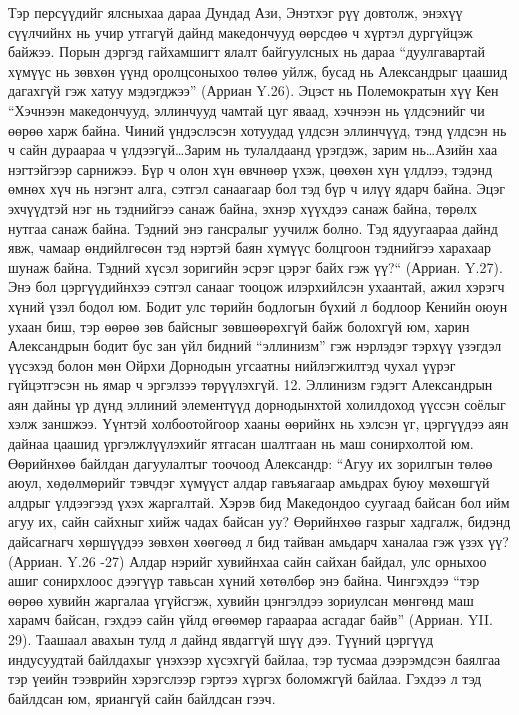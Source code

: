 Тэр персүүдийг ялсныхаа дараа Дундад Ази, Энэтхэг рүү довтолж, энэхүү сүүлчийнх нь учир утгагүй дайнд македончууд өөрсдөө ч хүртэл дургүйцэж байжээ. Порын дэргэд гайхамшигт ялалт байгуулсных нь дараа “дуулгавартай хүмүүс нь зөвхөн үүнд оролцсоныхоо төлөө уйлж, бусад нь Александрыг цаашид дагахгүй гэж хатуу мэдэгджээ” (Арриан Y.26). Эцэст нь Полемократын хүү Кен “Хэчнээн македончууд, эллинчууд чамтай цуг яваад, хэчнээн нь үлдсэнийг чи өөрөө харж байна. Чиний үндэслэсэн хотуудад үлдсэн эллинчүүд, тэнд үлдсэн нь ч сайн дураараа ч үлдээгүй…Зарим нь тулалдаанд үрэгдэж, зарим нь…Азийн хаа нэгтэйгээр сарнижээ. Бүр ч олон хүн өвчнөөр үхэж, цөөхөн хүн үлдлээ, тэдэнд өмнөх хүч нь нэгэнт алга, сэтгэл санаагаар бол тэд бүр ч илүү ядарч байна. Эцэг эхчүүдтэй нэг нь тэднийгээ санаж байна, эхнэр хүүхдээ санаж байна, төрөлх нутгаа санаж байна. Тэдний энэ гансралыг уучилж болно. Тэд ядуугаараа дайнд явж, чамаар өндийлгөсөн тэд нэртэй баян хүмүүс болцгоон тэднийгээ харахаар шунаж байна. Тэдний хүсэл зоригийн эсрэг цэрэг байх гэж үү?“ (Арриан. Y.27). Энэ бол цэргүүдийнхээ сэтгэл санааг тооцож илэрхийлсэн ухаантай, ажил хэрэгч хүний үзэл бодол юм. Бодит улс төрийн бодлогын бүхий л бодлоор Кенийн оюун ухаан биш, тэр өөрөө зөв байсныг зөвшөөрөхгүй байж болохгүй юм, харин Александрын бодит бус зан үйл бидний “эллинизм” гэж нэрлэдэг тэрхүү үзэгдэл үүсэхэд болон мөн Ойрхи Дорнодын угсаатны нийлэгжилтэд чухал үүрэг гүйцэтгэсэн нь ямар ч эргэлзээ төрүүлэхгүй. 12. Эллинизм гэдэгт Александрын аян дайны үр дүнд эллиний элементүүд дорнодынхтой холилдоход үүссэн соёлыг хэлж заншжээ.
Үүнтэй холбоотойгоор хааны өөрийнх нь хэлсэн үг, цэргүүдээ аян дайнаа цаашид үргэлжлүүлэхийг ятгасан шалтгаан нь маш сонирхолтой юм. Өөрийнхөө байлдан дагуулалтыг тоочоод Александр: “Агуу их зорилгын төлөө аюул, хөдөлмөрийг тэвчдэг хүмүүст алдар гавъяагаар амьдрах буюу мөхөшгүй алдрыг үлдээгээд үхэх жаргалтай. Хэрэв бид Македондоо суугаад байсан бол ийм агуу их, сайн сайхныг хийж чадах байсан уу? Өөрийнхөө газрыг хадгалж, бидэнд дайсагнагч хөршүүдээ зөвхөн хөөгөөд л бид тайван амьдарч ханалаа гэж үзэх үү? (Арриан. Y.26 -27) Алдар нэрийг хувийнхаа сайн сайхан байдал, улс орныхоо ашиг сонирхлоос дээгүүр тавьсан хүний хөтөлбөр энэ байна. Чингэхдээ “тэр өөрөө хувийн жаргалаа үгүйсгэж, хувийн цэнгэлдээ зориулсан мөнгөнд маш харамч байсан, гэхдээ сайн үйлд өгөөмөр гараараа асгадаг байв” (Арриан. YII. 29). Таашаал авахын тулд л дайнд явдаггүй шүү дээ. Түүний цэргүүд индусуудтай байлдахыг үнэхээр хүсэхгүй байлаа, тэр тусмаа дээрэмдсэн баялгаа тэр үеийн тээврийн хэрэгслээр гэртээ хүргэх боломжгүй байлаа. Гэхдээ л тэд байлдсан юм, яриангүй сайн байлдсан гээч.
